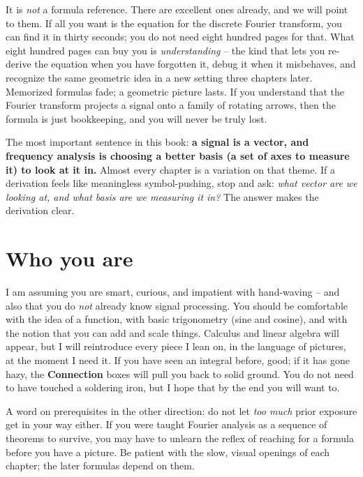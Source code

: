 It is \emph{not} a formula reference. There are excellent ones already, and we will point
to them. If all you want is the equation for the discrete Fourier transform, you can find
it in thirty seconds; you do not need eight hundred pages for that. What eight hundred
pages can buy you is \emph{understanding} -- the kind that lets you re-derive the equation
when you have forgotten it, debug it when it misbehaves, and recognize the same geometric idea
in a new setting three chapters later. Memorized formulas fade; a geometric picture lasts. If you
understand that the Fourier transform projects a signal onto a family of rotating arrows,
then the formula is just bookkeeping, and you will never be truly lost.

\begin{focusbox}
The most important sentence in this book: \textbf{a signal is a vector, and
frequency analysis is choosing a better basis (a set of axes to measure it) to look at it in.} Almost every chapter is
a variation on that theme. If a derivation feels like meaningless symbol-pushing,
stop and ask: \emph{what vector are we looking at, and what basis are we measuring it in?}
The answer makes the derivation clear.
\end{focusbox}

\section*{Who you are}

I am assuming you are smart, curious, and impatient with hand-waving -- and also that you
do \emph{not} already know signal processing. You should be comfortable with the idea of a
function, with basic trigonometry (sine and cosine), and with the notion that you can add
and scale things. Calculus and linear algebra will appear, but I will reintroduce every
piece I lean on, in the language of pictures, at the moment I need it. If you have seen an
integral before, good; if it has gone hazy, the \textbf{Connection} boxes will pull you back
to solid ground. You do not need to have touched a soldering iron, but I hope that by the
end you will want to.

A word on prerequisites in the other direction: do not let \emph{too much} prior exposure
get in your way either. If you were taught Fourier analysis as a sequence of theorems to
survive, you may have to unlearn the reflex of reaching for a formula before you have a
picture. Be patient with the slow, visual openings of each chapter; the later formulas depend
on them.

